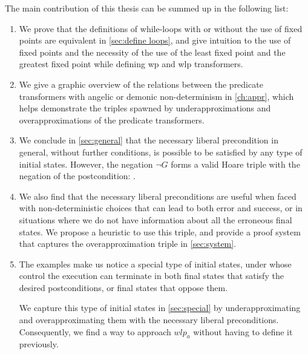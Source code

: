 The main contribution of this thesis can be summed up in the following list: 
\begin{enumerate}
    \item We prove that the definitions of while-loops with or without the use of fixed points are equivalent in \autoref{sec:define loops}, and give intuition to the use of fixed points and the necessity of the use of the least fixed point and the greatest fixed point while defining wp and wlp transformers. 
    \item We give a graphic overview of the relations between the predicate transformers with angelic or demonic non-determinism in \autoref{ch:appr}, which helps demonstrate the triples spawned by underapproximations and overapproximations of the predicate transformers. 
    \item We conclude in \autoref{sec:general} that the necessary liberal precondition in general, without further conditions, is possible to be satisfied by any type of initial states. However, the negation $\neg G$ forms a valid Hoare triple with the negation of the postcondition: . 
    \item We also find that the necessary liberal preconditions are useful when faced with non-deterministic choices that can lead to both error and success, or in situations where we do not have information about all the erroneous final states. We propose a heuristic to use this triple, and provide a proof system that captures the overapproximation triple in \autoref{sec:system}. 
    \item The examples make us notice a special type of initial states, under whose control the execution can terminate in both final states that satisfy the desired postconditions, or final states that oppose them. 
    
    We capture this type of initial states in \autoref{sec:special} by underapproximating and overapproximating them with the necessary liberal preconditions. Consequently, we find a way to approach $wlp_a$ without having to define it previously. 
\end{enumerate}


